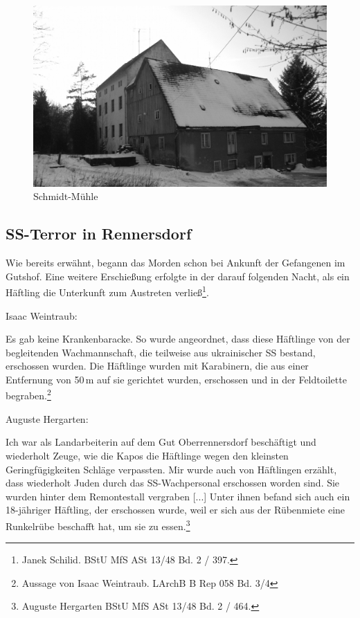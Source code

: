 \begin{figure}[htb]
    \includegraphics[width=\linewidth]{images/renn02}
    \caption{Schmidt-Mühle}
    \label{schmidtfoto}
\end{figure}



\subsection{SS-Terror in Rennersdorf}

Wie bereits erwähnt, begann das Morden schon bei Ankunft der Gefangenen im Gutshof. Eine weitere Erschießung erfolgte in der darauf folgenden Nacht, als ein Häftling die Unterkunft zum Austreten verließ\footnote{Janek Schilid. BStU MfS ASt 13/48 Bd. 2 / 397.}. 

Isaac Weintraub:
\begin{leftbar} 
Es gab keine Krankenbaracke. So wurde angeordnet, dass diese Häftlinge von der begleitenden Wachmannschaft, die teilweise aus ukrainischer SS bestand, erschossen wurden. Die Häftlinge wurden mit Karabinern, die aus einer Entfernung von 50\,m auf sie gerichtet wurden, erschossen und in der Feldtoilette begraben.\footnote{Aussage von Isaac Weintraub. LArchB B Rep 058 Bd. 3/4}
\end{leftbar}
Auguste Hergarten: 
\begin{leftbar} 
Ich war als Landarbeiterin auf dem Gut Oberrennersdorf beschäftigt und wiederholt Zeuge, wie die Kapos die Häftlinge wegen den kleinsten Geringfügigkeiten Schläge verpassten. Mir wurde auch von Häftlingen erzählt, dass wiederholt Juden durch das SS-Wachpersonal erschossen worden sind. Sie wurden hinter dem Remontestall vergraben [...]
Unter ihnen befand sich auch ein 18-jähriger Häftling, der erschossen wurde, weil er sich aus der Rübenmiete eine Runkelrübe beschafft hat, um sie zu essen.\footnote{Auguste Hergarten BStU MfS ASt 13/48 Bd. 2 / 464.}
\end{leftbar}


